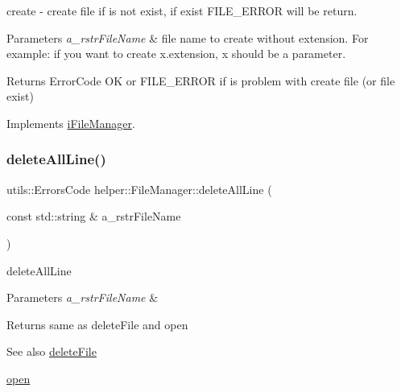 create -\/ create file if is not exist, if exist F\+I\+L\+E\+\_\+\+E\+R\+R\+OR will be return. 


\begin{DoxyParams}{Parameters}
{\em a\+\_\+rstr\+File\+Name} & file name to create without extension. For example\+: if you want to create x.\+extension, x should be a parameter. \\
\hline
\end{DoxyParams}
\begin{DoxyReturn}{Returns}
Error\+Code OK or F\+I\+L\+E\+\_\+\+E\+R\+R\+OR if is problem with create file (or file exist) 
\end{DoxyReturn}


Implements \mbox{\hyperlink{classi_file_manager}{i\+File\+Manager}}.

\mbox{\label{classhelper_1_1_file_manager_a2ff9bcaf3345c13cd7eedb53e3f9841c}} 
\subsubsection{\texorpdfstring{deleteAllLine()}{deleteAllLine()}}
{\footnotesize\ttfamily utils\+::\+Errors\+Code helper\+::\+File\+Manager\+::delete\+All\+Line (\begin{DoxyParamCaption}\item[{const std\+::string \&}]{a\+\_\+rstr\+File\+Name }\end{DoxyParamCaption})\hspace{0.3cm}{\ttfamily [virtual]}}



delete\+All\+Line 


\begin{DoxyParams}{Parameters}
{\em a\+\_\+rstr\+File\+Name} & \\
\hline
\end{DoxyParams}
\begin{DoxyReturn}{Returns}
same as delete\+File and open 
\end{DoxyReturn}
\begin{DoxySeeAlso}{See also}
\mbox{\hyperlink{classhelper_1_1_file_manager_aa1bc4e046b1975d24ac2b8d575792692}{delete\+File}} 

\mbox{\hyperlink{classhelper_1_1_file_manager_a0b4bac7ff95be0bdad0b70987a25b63c}{open}} 
\end{DoxySeeAlso}


